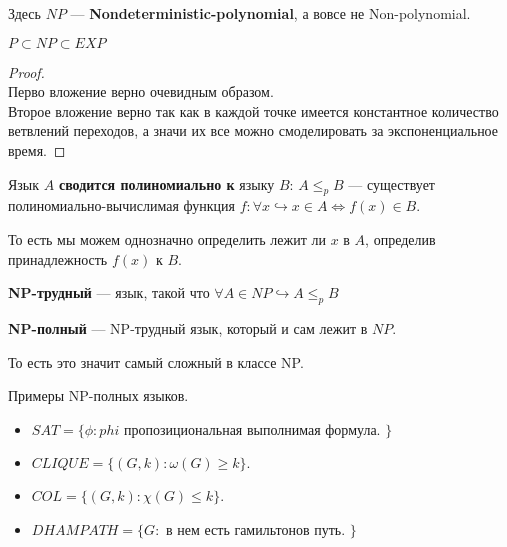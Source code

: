 \begin{note}
   Здесь $NP$ ---  \textbf{Nondeterministic-polynomial}, а вовсе не Non-polynomial. 
\end{note}

\begin{theorem}
   $P \subset NP \subset EXP$ 
\end{theorem}
\begin{proof} \ \\
   Перво вложение верно очевидным образом. \\
   Второе вложение верно так как в каждой точке имеется константное количество ветвлений переходов, а значи их все можно смоделировать за экспоненциальное время.
\end{proof}

\begin{Def}
    Язык $A$ \textbf{сводится полиномиально к} языку $B$: $A \leq_p B$ --- 
    существует полиномиально-вычислимая функция  $f: \forall x \hookrightarrow x \in A \iff f(x) \in B$.
\end{Def}
\begin{note}
    То есть мы можем однозначно определить лежит ли $x$ в  $A$, определив принадлежность $f(x)$ к $B$.
\end{note}

\begin{Def}
   \textbf{NP-трудный} --- язык, такой что $\forall A \in NP \hookrightarrow A \leq_p B$
\end{Def}

\begin{Def}
   \textbf{NP-полный} --- NP-трудный язык, который и сам лежит в  $NP$.
\end{Def}
\begin{note}
   То есть это значит самый сложный в классе NP. 
\end{note}

\begin{example}
    Примеры NP-полных языков. 
    \begin{itemize}
        \item $SAT = \{\phi: phi \text{ пропозициональная выполнимая формула. \}}$
        \item $CLIQUE = \{(G, k): \omega(G) \geq k\}$.
        \item $COL = \{(G, k): \chi(G) \leq k\}$.
        \item $DHAMPATH = \{G: \text{ в нем есть гамильтонов путь. }\}$
    \end{itemize} 
\end{example}


